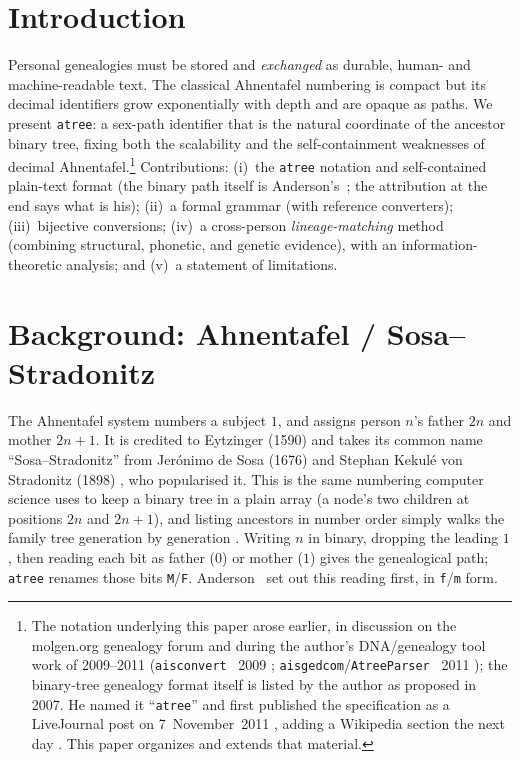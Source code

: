 \documentclass[11pt]{article}
\newcommand{\atree}{\texttt{atree}}
\begin{document}
\section{Introduction}
\label{sec:intro}
Personal genealogies must be stored and \emph{exchanged} as durable, human- and machine-readable
text. The classical Ahnentafel numbering is compact but its decimal identifiers grow exponentially
with depth and are opaque as paths. We present \atree: a sex-path identifier that is the natural
coordinate of the ancestor binary tree, fixing both the scalability and the self-containment
weaknesses of decimal Ahnentafel.\footnote{The notation underlying this paper arose earlier, in discussion on the molgen.org
genealogy forum and during the author's DNA/genealogy tool work of 2009--2011 (\texttt{aisconvert}
\textcopyright~2009 \cite{aisconvert}; \texttt{aisgedcom}/\texttt{AtreeParser} \textcopyright~2011
\cite{aisgedcom}); the binary-tree genealogy format itself is listed by the author as proposed in
2007. He named it ``\atree'' and first published the specification as a LiveJournal post on
7~November~2011 \cite{lj_atree}, adding a Wikipedia section the next day \cite{wiki_gns}. This paper
organizes and extends that material.}
Contributions: (i)~the \atree{} notation and self-contained plain-text format (the binary path
itself is Anderson's~\cite{anderson1995}; the attribution at the end says what is his); (ii)~a formal
grammar (with reference converters); (iii)~bijective conversions;
(iv)~a cross-person \emph{lineage-matching} method (combining structural, phonetic, and genetic evidence),
with an information-theoretic analysis; and (v)~a statement of limitations.

\section{Background: Ahnentafel / Sosa--Stradonitz}
\label{sec:background}
The Ahnentafel system \cite{eytzinger1590, wiki_ahnentafel} numbers a subject $1$, and assigns
person $n$'s father $2n$ and mother $2n{+}1$. It is credited to Eytzinger (1590) and takes its
common name ``Sosa--Stradonitz'' from Jer\'onimo de Sosa (1676) \cite{sosa1676} and Stephan
Kekul\'e von Stradonitz (1898) \cite{kekule1898}, who popularised it. This is the same numbering
computer science uses to keep a binary tree in a plain array (a node's two children at positions
$2n$ and $2n{+}1$), and listing ancestors in number order simply walks the family tree generation by
generation \cite{knuth_taocp3, clrs}. Writing $n$ in binary, dropping the leading $1$, then reading
each bit as father ($0$) or mother ($1$) gives the genealogical path; \atree{} renames those bits
\texttt{M}/\texttt{F}. Anderson~\cite{anderson1995} set out this reading first, in
\texttt{f}/\texttt{m} form.
\end{document}
